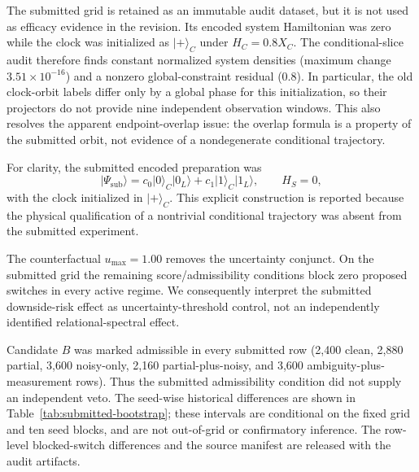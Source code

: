 \documentclass[11pt]{article}
\numberwithin{equation}{section}
\begin{document}
The submitted grid is retained as an immutable audit dataset, but it is not used
as efficacy evidence in the revision.  Its encoded system Hamiltonian was zero
while the clock was initialized as $|+\rangle_C$ under $H_C=0.8X_C$.  The
conditional-slice audit therefore finds constant normalized system densities
(maximum change $3.51\times10^{-16}$) and a nonzero global-constraint residual
(0.8).  In particular, the old clock-orbit labels differ only by a global phase
for this initialization, so their projectors do not provide nine independent
observation windows.  This also resolves the apparent endpoint-overlap issue:
the overlap formula is a property of the submitted orbit, not evidence of a
nondegenerate conditional trajectory.

For clarity, the submitted encoded preparation was
\begin{equation}
|\Psi_{\mathrm{sub}}\rangle
=c_0|0\rangle_C|0_L\rangle+c_1|1\rangle_C|1_L\rangle,
\qquad H_S=0,
\end{equation}
with the clock initialized in $|+\rangle_C$.  This explicit construction is
reported because the physical qualification of a nontrivial conditional
trajectory was absent from the submitted experiment.

The counterfactual $u_{\max}=1.00$ removes the uncertainty conjunct.  On the
submitted grid the remaining score/admissibility conditions block zero proposed
switches in every active regime.  We consequently interpret the submitted
downside-risk effect as uncertainty-threshold control, not an independently
identified relational-spectral effect.

Candidate $B$ was marked admissible in every submitted row (2,400 clean, 2,880
partial, 3,600 noisy-only, 2,160 partial-plus-noisy, and 3,600
ambiguity-plus-measurement rows).  Thus the submitted admissibility condition did
not supply an independent veto.  The seed-wise historical differences are shown
in Table~\ref{tab:submitted-bootstrap}; these intervals are conditional on the
fixed grid and ten seed blocks, and are not out-of-grid or confirmatory
inference.  The row-level blocked-switch differences and the source manifest are
released with the audit artifacts.
\end{document}
